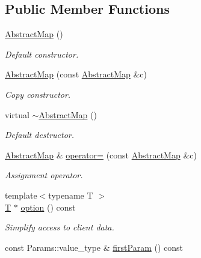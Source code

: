 \subsection*{Public Member Functions}
\begin{DoxyCompactItemize}
\item 
\hyperlink{class_d_d4hep_1_1_conditions_1_1_abstract_map_a8642c9a5024d3390bd2cb8e3c889073a}{Abstract\+Map} ()
\begin{DoxyCompactList}\small\item\em Default constructor. \end{DoxyCompactList}\item 
\hyperlink{class_d_d4hep_1_1_conditions_1_1_abstract_map_a0792cc7e113b71a15f238b363b95816d}{Abstract\+Map} (const \hyperlink{class_d_d4hep_1_1_conditions_1_1_abstract_map}{Abstract\+Map} \&c)
\begin{DoxyCompactList}\small\item\em Copy constructor. \end{DoxyCompactList}\item 
virtual \hyperlink{class_d_d4hep_1_1_conditions_1_1_abstract_map_ab2fbb46108e2905fb1193a67510d41f0}{$\sim$\+Abstract\+Map} ()
\begin{DoxyCompactList}\small\item\em Default destructor. \end{DoxyCompactList}\item 
\hyperlink{class_d_d4hep_1_1_conditions_1_1_abstract_map}{Abstract\+Map} \& \hyperlink{class_d_d4hep_1_1_conditions_1_1_abstract_map_a31459d63620c03e542eea7903e25ff33}{operator=} (const \hyperlink{class_d_d4hep_1_1_conditions_1_1_abstract_map}{Abstract\+Map} \&c)
\begin{DoxyCompactList}\small\item\em Assignment operator. \end{DoxyCompactList}\item 
{\footnotesize template$<$typename T $>$ }\\\hyperlink{class_t}{T} $\ast$ \hyperlink{class_d_d4hep_1_1_conditions_1_1_abstract_map_a3fcf32e790b916135380a6f77ab06cf0}{option} () const
\begin{DoxyCompactList}\small\item\em Simplify access to client data. \end{DoxyCompactList}\item 
const Params\+::value\+\_\+type \& \hyperlink{class_d_d4hep_1_1_conditions_1_1_abstract_map_a0a92ec7fb886bc1809b560f9a63a4dda}{first\+Param} () const

\end{DoxyCompactItemize}
